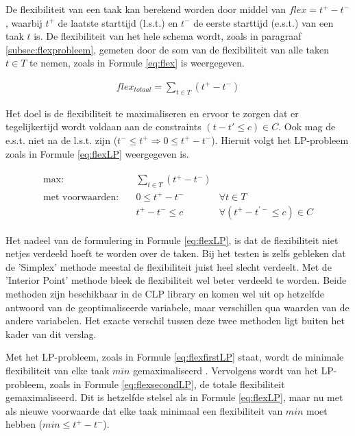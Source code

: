 De flexibiliteit van een taak kan berekend worden door middel van $flex = t^+ - t^-$, waarbij $t^+$ de laatste starttijd (l.s.t.) en $t^-$ de eerste starttijd (e.s.t.) van een taak $t$ is. De flexibiliteit van het hele schema wordt, zoals in paragraaf \ref{subsec:flexprobleem}, gemeten door de som van de flexibiliteit van alle taken $t \in T$ te nemen, zoals in Formule \ref{eq:flex} is weergegeven. 

\begin{align}
\label{eq:flex}
    flex_{totaal} = \sum_{t \in T} (t^+ - t^-)
\end{align}

Het doel is de flexibiliteit te maximaliseren en ervoor te zorgen dat er tegelijkertijd wordt voldaan aan de constraints $(t - t' \leq c) \in C$. Ook mag de e.s.t. niet na de l.s.t. zijn ($t^- \leq t^+ \Rightarrow 0 \leq t^+ - t^-$). Hieruit volgt het LP-probleem zoals in Formule \ref{eq:flexLP} weergegeven is.

\begin{align}
\label{eq:flexLP}
\begin{aligned}
        \text{max:}& \quad \sum_{t \in T} (t^+ - t^-) & \\
 \text{met voorwaarden:}& \quad 0 \leq t^+ - t^- & \forall t \in T \\
                   & \quad t^+ - t^- \leq c & \forall (t^+ - t^{'-} \leq c) \in C
\end{aligned}
\end{align}

Het nadeel van de formulering in Formule \ref{eq:flexLP}, is dat de flexibiliteit niet netjes verdeeld hoeft te worden over de taken. Bij het testen is zelfs gebleken dat de 'Simplex' methode meestal de flexibiliteit juist heel slecht verdeelt. Met de 'Interior Point' methode bleek de flexibiliteit wel beter verdeeld te worden. Beide methoden zijn beschikbaar in de CLP library en komen wel uit op hetzelfde antwoord van de geoptimaliseerde variabele, maar verschillen qua waarden van de andere variabelen. Het exacte verschil tussen deze twee methoden ligt buiten het kader van dit verslag.

Met het LP-probleem, zoals in Formule \ref{eq:flexfirstLP} staat, wordt de minimale flexibiliteit van elke taak $min$ gemaximaliseerd \cite{wilmer13}. Vervolgens wordt van het LP-probleem, zoals in Formule \ref{eq:flexsecondLP}, de totale flexibiliteit gemaximaliseerd. Dit is hetzelfde stelsel als in Formule \ref{eq:flexLP}, maar nu met als nieuwe voorwaarde dat elke taak minimaal een flexibiliteit van $min$ moet hebben ($min \leq t^+ - t^ -$). 

